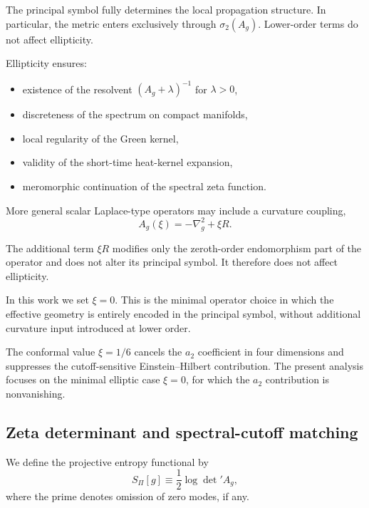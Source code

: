 \documentclass[pdflatex,sn-mathphys-num]{sn-jnl} %
\theoremstyle{remark}
\theoremstyle{plain}
\begin{document}
    The principal symbol fully determines the local propagation structure.
    In particular, the metric enters exclusively through $\sigma_2(A_g)$.
    Lower-order terms do not affect ellipticity.

    Ellipticity ensures:

    \begin{itemize}
      \item existence of the resolvent $(A_g+\lambda)^{-1}$ for $\lambda>0$,
      \item discreteness of the spectrum on compact manifolds,
      \item local regularity of the Green kernel,
      \item validity of the short-time heat-kernel expansion,
      \item meromorphic continuation of the spectral zeta function.
    \end{itemize}

    More general scalar Laplace-type operators may include a curvature coupling,
    \begin{equation}
      A_g(\xi) = -\nabla_g^2 + \xi R .
    \end{equation}

    The additional term $\xi R$ modifies only the zeroth-order endomorphism
    part of the operator and does not alter its principal symbol.
    It therefore does not affect ellipticity.

    In this work we set $\xi=0$.
    This is the minimal operator choice in which the effective geometry is
    entirely encoded in the principal symbol, without additional curvature
    input introduced at lower order.

    The conformal value $\xi=1/6$ cancels the $a_2$ coefficient in four
    dimensions and suppresses the cutoff-sensitive Einstein--Hilbert contribution.
    The present analysis focuses on the minimal elliptic case $\xi=0$,
    for which the $a_2$ contribution is nonvanishing.

  \subsection{Zeta determinant and spectral-cutoff matching}
    \label{subsec:zeta-regularization}

    We define the projective entropy functional by
    \begin{equation}
      S_\Pi[g] \equiv \frac12 \log \det\nolimits' A_g ,
    \end{equation}
    where the prime denotes omission of zero modes, if any.
\end{document}
